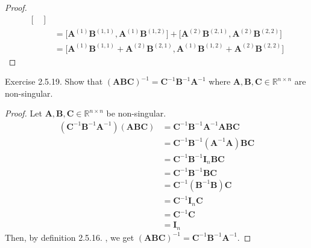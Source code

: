 \documentclass{article}
\theoremstyle{plain}
\begin{document}
\begin{proof}
\begin{equation*}
\begin{split}
\begin{bmatrix}
			\end{bmatrix} \\
			&= \lbrack \bm{A}^{(1)} \bm{B}^{(1,1)} , \bm{A}^{(1)} \bm{B}^{(1,2)} \rbrack + \lbrack \bm{A}^{(2)} \bm{B}^{(2,1)} , \bm{A}^{(2)} \bm{B}^{(2,2)} \rbrack \\
			&= \lbrack \bm{A}^{(1)} \bm{B}^{(1,1)} + \bm{A}^{(2)} \bm{B}^{(2,1)} , \bm{A}^{(1)} \bm{B}^{(1,2)} + \bm{A}^{(2)} \bm{B}^{(2,2)} \rbrack
		\end{split}
	\end{equation*}
	\normalsize
\end{proof}

\begin{itembox}[l]{Exercise 2.5.19.}
	Show that
	\begin{math}
		(\bm{ABC})^{-1} = \bm{C}^{-1} \bm{B}^{-1} \bm{A}^{-1}
	\end{math}
	where
	\begin{math}
		\bm{A} , \bm{B} , \bm{C} \in \mathbb{R}^{n \times n}
	\end{math}
	are non-singular.
\end{itembox}

\begin{proof}
	Let
	\begin{math}
		\bm{A} , \bm{B} , \bm{C} \in \mathbb{R}^{n \times n}
	\end{math}
	be non-singular.
	\begin{equation*}
		\begin{split}
			(\bm{C}^{-1} \bm{B}^{-1} \bm{A}^{-1}) (\bm{ABC}) &= \bm{C}^{-1} \bm{B}^{-1} \bm{A}^{-1} \bm{ABC} \\
			&= \bm{C}^{-1} \bm{B}^{-1} (\bm{A}^{-1} \bm{A}) \bm{BC} \\
			&= \bm{C}^{-1} \bm{B}^{-1} \bm{I}_n \bm{BC} \\
			&= \bm{C}^{-1} \bm{B}^{-1} \bm{BC} \\
			&= \bm{C}^{-1} (\bm{B}^{-1} \bm{B}) \bm{C} \\
			&= \bm{C}^{-1} \bm{I}_n \bm{C} \\
			&= \bm{C}^{-1} \bm{C} \\
			&= \bm{I}_n
		\end{split}
	\end{equation*}
	Then, by definition 2.5.16. , we get
	\begin{math}
		(\bm{ABC})^{-1} = \bm{C}^{-1} \bm{B}^{-1} \bm{A}^{-1} .
	\end{math}
\end{proof}
\end{document}
